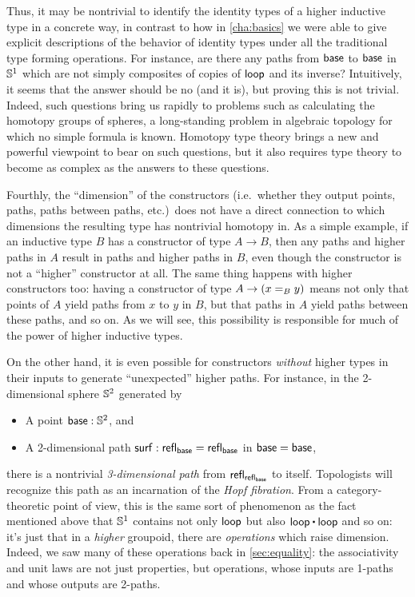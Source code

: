 Thus, it may be nontrivial to identify the identity types of a higher inductive type in a concrete way, in contrast to how in \autoref{cha:basics} we were able to give explicit descriptions of the behavior of identity types under all the traditional type forming operations.
For instance, are there any paths from $\base$ to $\base$ in $\Sn^1$ which are not simply composites of copies of $\lloop$ and its inverse?
Intuitively, it seems that the answer should be no (and it is), but proving this is not trivial.
Indeed, such questions bring us rapidly to problems such as calculating the homotopy groups of spheres, a long-standing problem in algebraic topology for which no simple formula is known.
Homotopy type theory brings a new and powerful viewpoint to bear on such questions, but it also requires type theory to become as complex as the answers to these questions.

Fourthly, the ``dimension'' of the constructors (i.e.\ whether they output points, paths, paths between paths, etc.)\ does not have a direct connection to which dimensions the resulting type has nontrivial homotopy in.
As a simple example, if an inductive type $B$ has a constructor of type $A\to B$, then any paths and higher paths in $A$ result in paths and higher paths in $B$, even though the constructor is not a ``higher'' constructor at all.
The same thing happens with higher constructors too: having a constructor of type $A\to (\id[B]xy)$ means not only that points of $A$ yield paths from $x$ to $y$ in $B$, but that paths in $A$ yield paths between these paths, and so on.
As we will see, this possibility is responsible for much of the power of higher inductive types.

On the other hand, it is even possible for constructors \emph{without} higher types in their inputs to generate ``unexpected'' higher paths.
For instance, in the 2-dimensional sphere $\Sn^2$ generated by
\begin{itemize}
\item A point $\base:\Sn^2$, and
\item A 2-dimensional path $\surf:\refl{\base} = \refl{\base}$ in ${\base=\base}$,
\end{itemize}
there is a nontrivial \emph{3-dimensional path} from $\refl{\refl{\base}}$ to itself.
Topologists will recognize this path as an incarnation of the \emph{Hopf fibration}.
From a category-theoretic point of view, this is the same sort of phenomenon as the fact mentioned above that $\Sn^1$ contains not only $\lloop$ but also $\lloop\ct\lloop$ and so on: it's just that in a \emph{higher} groupoid, there are \emph{operations} which raise dimension.
Indeed, we saw many of these operations back in \autoref{sec:equality}: the associativity and unit laws are not just properties, but operations, whose inputs are 1-paths and whose outputs are 2-paths.

